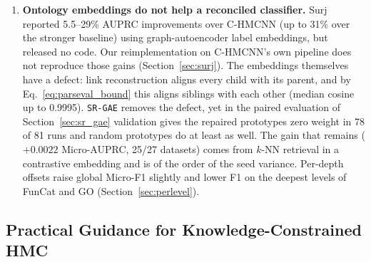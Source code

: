 \documentclass[preprint,12pt]{elsarticle}
\begin{document}
\begin{enumerate}[leftmargin=*,nosep]
  \item \textbf{Ontology embeddings do not help a reconciled classifier.}
    Surj~\cite{www2022ontology} reported 5.5--29\% AUPRC improvements over
    C-HMCNN (up to 31\% over the stronger baseline) using graph-autoencoder label embeddings, but
    released no code. Our reimplementation on C-HMCNN's own pipeline
    does not reproduce those gains (Section~\ref{sec:surj}). The embeddings
    themselves have a defect: link reconstruction aligns every child with
    its parent, and by Eq.~\eqref{eq:parseval_bound} this aligns siblings
    with each other (median cosine up to 0.9995). \texttt{SR-GAE} removes the
    defect, yet in the paired evaluation of Section~\ref{sec:sr_gae}
    validation gives the repaired prototypes zero weight in 78 of 81 runs
    and random prototypes do at least as well. The gain that remains
    ($+0.0022$ Micro-AUPRC, 25/27 datasets) comes from $k$-NN retrieval in a
    contrastive embedding and is of the order of the seed variance. Per-depth
    offsets raise global Micro-F1 slightly and lower F1 on the deepest
    levels of FunCat and GO (Section~\ref{sec:perlevel}).
\end{enumerate}

\subsection{Practical Guidance for Knowledge-Constrained HMC}
\end{document}
